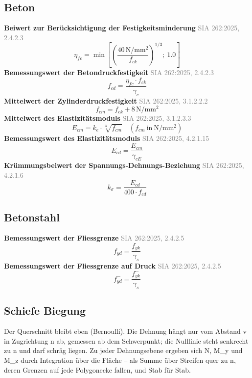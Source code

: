 \documentclass[11pt,a4paper]{article}
\newcommand{\normref}[1]{{\small\textcolor{gray}{#1}}}
\begin{document}
\subsection{Beton}
\noindent\textbf{Beiwert zur Berücksichtigung der Festigkeitsminderung} \hfill \normref{SIA 262:2025, 2.4.2.3}
\begin{equation*}
\eta_{fc} = \min\left[\left(\frac{40\,\mathrm{N}/\mathrm{mm}^{2}}{f_{ck}}\right)^{1/3};\ 1.0\right]
\end{equation*}
\noindent\textbf{Bemessungswert der Betondruckfestigkeit} \hfill \normref{SIA 262:2025, 2.4.2.3}
\begin{equation*}
f_{cd} = \frac{\eta_{fc} \cdot f_{ck}}{\gamma_c}
\end{equation*}
\noindent\textbf{Mittelwert der Zylinderdruckfestigkeit} \hfill \normref{SIA 262:2025, 3.1.2.2.2}
\begin{equation*}
f_{cm} = f_{ck} + 8\,\mathrm{N}/\mathrm{mm}^{2}
\end{equation*}
\noindent\textbf{Mittelwert des Elastizitätsmoduls} \hfill \normref{SIA 262:2025, 3.1.2.3.3}
\begin{equation*}
E_{cm} = k_e \cdot \sqrt[3]{f_{cm}} \quad \left(f_{cm}\ \text{in}\ \mathrm{N}/\mathrm{mm}^{2}\right)
\end{equation*}
\noindent\textbf{Bemessungswert des Elastizitätsmoduls} \hfill \normref{SIA 262:2025, 4.2.1.15}
\begin{equation*}
E_{cd} = \frac{E_{cm}}{\gamma_{cE}}
\end{equation*}
\noindent\textbf{Krümmungsbeiwert der Spannungs-Dehnungs-Beziehung} \hfill \normref{SIA 262:2025, 4.2.1.6}
\begin{equation*}
k_{\sigma} = \frac{E_{cd}}{400 \cdot f_{cd}}
\end{equation*}
\subsection{Betonstahl}
\noindent\textbf{Bemessungswert der Fliessgrenze} \hfill \normref{SIA 262:2025, 2.4.2.5}
\begin{equation*}
f_{yd} = \frac{f_{yk}}{\gamma_s}
\end{equation*}
\noindent\textbf{Bemessungswert der Fliessgrenze auf Druck} \hfill \normref{SIA 262:2025, 2.4.2.5}
\begin{equation*}
f_{yd}^{-} = \frac{f_{yk}^{-}}{\gamma_s}
\end{equation*}
\subsection{Schiefe Biegung}
Der Querschnitt bleibt eben (Bernoulli). Die Dehnung hängt nur vom Abstand v in Zugrichtung n ab, gemessen ab dem Schwerpunkt; die Nulllinie steht senkrecht zu n und darf schräg liegen. Zu jeder Dehnungsebene ergeben sich N, M\_y und M\_z durch Integration über die Fläche -- als Summe über Streifen quer zu n, deren Grenzen auf jede Polygonecke fallen, und Stab für Stab.
\end{document}
